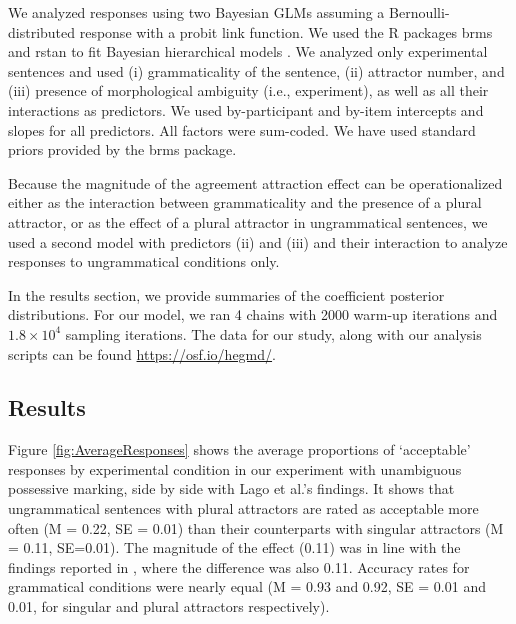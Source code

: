 \documentclass[apacite,linguex]{glossa}\usepackage[]{graphicx}\usepackage[]{color}
\begin{document}
We analyzed responses using two Bayesian GLMs assuming a Bernoulli-distributed response with a probit link function.  We used the R packages brms \citep{brms} and rstan \citep{rstan} to fit Bayesian hierarchical models \citep[e.g.,][]{GelmanHill:2007, NicenboimVasishth:2016}. 
We analyzed only experimental sentences and used (i) grammaticality of the sentence, (ii) attractor number, and (iii) presence of morphological ambiguity (i.e., experiment), as well as all their interactions as predictors. We used by-participant and by-item intercepts and slopes for all predictors. 
All factors were sum-coded. We have used standard priors provided by the brms package. 

Because the magnitude of the agreement attraction effect can be operationalized either as the interaction between grammaticality and the presence of a plural attractor, or as the effect of a plural attractor in ungrammatical sentences, we used a second model with predictors (ii) and (iii) and their interaction to analyze responses to ungrammatical conditions only.

In the results section, we provide summaries of the coefficient posterior distributions. For our model, we ran 4 chains with 2000 warm-up iterations and \ensuremath{1.8\times 10^{4}} sampling iterations. The data for our study, along with our analysis scripts can be found \url{https://osf.io/hegmd/}.


\subsection{Results}

Figure \ref{fig:AverageResponses} shows the average proportions of `acceptable' responses by experimental condition in our experiment with unambiguous possessive marking, side by side with Lago et al.'s findings. It shows that ungrammatical sentences with plural attractors are rated as acceptable more often (M = 0.22, SE = 0.01) than their counterparts with singular attractors (M = 0.11, SE=0.01). The magnitude of the effect (0.11) was in line with the findings reported in \citet{LagoEtAl:2019}, where the difference was also 0.11. Accuracy rates for grammatical conditions were nearly equal (M = 0.93 and 0.92, SE = 0.01 and 0.01, for singular and plural attractors respectively).
\end{document}
